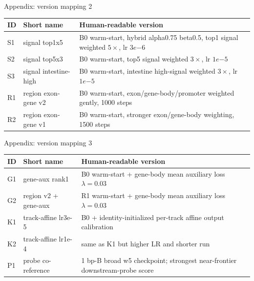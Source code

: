 \documentclass[UTF8,aspectratio=169,10pt]{ctexbeamer}
\begin{document}
\begin{frame}{Appendix: version mapping 2}
  \footnotesize
  \begin{tabular}{p{}p{}p{}}
    \toprule
    ID & Short name & Human-readable version \\
    \midrule
    S1 & signal top1x5 & B0 warm-start, hybrid alpha0.75 beta0.5, top1 signal weighted $5\times$, lr $3e{-6}$ \\
    S2 & signal top5x3 & B0 warm-start, top5 signal weighted $3\times$, lr $1e{-5}$ \\
    S3 & signal intestine-high & B0 warm-start, intestine high-signal weighted $3\times$, lr $1e{-5}$ \\
    R1 & region exon-gene v2 & B0 warm-start, exon/gene-body/promoter weighted gently, 1000 steps \\
    R2 & region exon-gene v1 & B0 warm-start, stronger exon/gene-body weighting, 1500 steps \\
    \bottomrule
  \end{tabular}
\end{frame}

\begin{frame}{Appendix: version mapping 3}
  \footnotesize
  \begin{tabular}{p{}p{}p{}}
    \toprule
    ID & Short name & Human-readable version \\
    \midrule
    G1 & gene-aux rank1 & B0 warm-start + gene-body mean auxiliary loss $\lambda=0.03$ \\
    G2 & region v2 + gene-aux & R1 warm-start + gene-body mean auxiliary loss $\lambda=0.03$ \\
    K1 & track-affine lr3e-5 & B0 + identity-initialized per-track affine output calibration \\
    K2 & track-affine lr1e-4 & same as K1 but higher LR and shorter run \\
    P1 & probe co-reference & 1 bp-B broad w5 checkpoint; strongest near-frontier downstream-probe score \\
    \bottomrule
  \end{tabular}
\end{frame}
\end{document}
